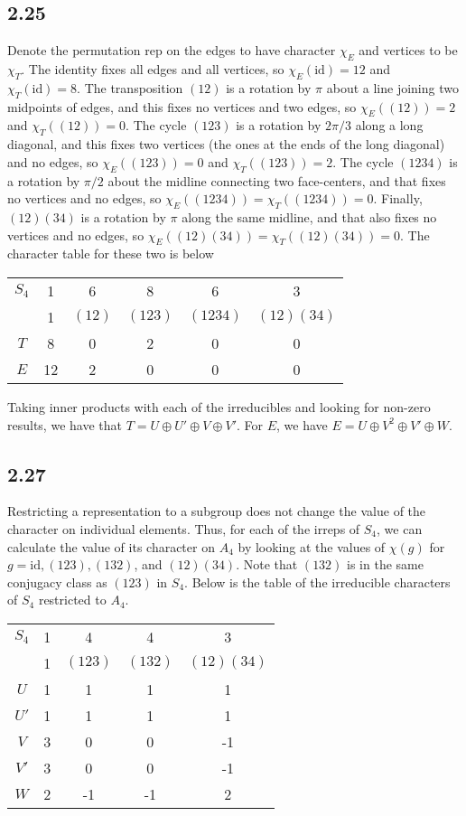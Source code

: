 \documentclass{article}
\begin{document}
\subsection*{2.25}
Denote the permutation rep on the edges to have character $\chi_E$ and vertices to be $\chi_T$. The identity fixes all edges and all vertices, so $\chi_E(\text{id})=12$ and $\chi_T(\text{id})=8$. The transposition $(12)$ is a rotation by $\pi$ about a line joining two midpoints of edges, and this fixes no vertices and two edges, so $\chi_E((12))=2$ and $\chi_T((12))=0$. The cycle $(123)$ is a rotation by $2\pi/3$ along a long diagonal, and this fixes two vertices (the ones at the ends of the long diagonal) and no edges, so $\chi_E((123))=0$ and $\chi_T((123))=2$. The cycle $(1234)$ is a rotation by $\pi/2$ about the midline connecting two face-centers, and that fixes no vertices and no edges, so $\chi_E((1234))=\chi_T((1234))=0$. Finally, $(12)(34)$ is a rotation by $\pi$ along the same midline, and that also fixes no vertices and no edges, so $\chi_E((12)(34))=\chi_T((12)(34))=0$. The character table for these two is below

\begin{tabular}{c|ccccc}
    $S_4$&1&6&8&6&3\\
         &1&$(12)$&$(123)$&$(1234)$&$(12)(34)$\\
    \hline
    $T$&8&0&2&0&0\\
    $E$&12&2&0&0&0\\
\end{tabular}

Taking inner products with each of the irreducibles and looking for non-zero results, we have that $T=U\oplus U'\oplus V\oplus V'$. For $E$, we have $E=U\oplus V^2\oplus V'\oplus W$.
\subsection*{2.27}
Restricting a representation to a subgroup does not change the value of the character on individual elements. Thus, for each of the irreps of $S_4$, we can calculate the value of its character on $A_4$ by looking at the values of $\chi(g)$ for $g=\text{id},(123),(132)$, and $(12)(34)$. Note that $(132)$ is in the same conjugacy class as $(123)$ in $S_4$. Below is the table of the irreducible characters of $S_4$ restricted to $A_4$.

\begin{tabular}{c|cccc}
    $S_4$&1&4&4&3\\
         &1&$(123)$&$(132)$&$(12)(34)$\\
    \hline
    $U$&1&1&1&1\\
    $U'$&1&1&1&1\\
    $V$&3&0&0&-1\\
    $V'$&3&0&0&-1\\
    $W$&2&-1&-1&2\\
\end{tabular}
\end{document}
